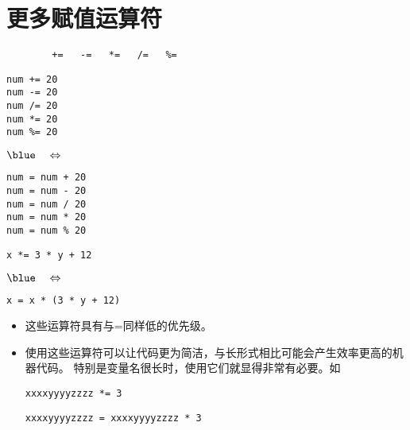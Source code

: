 \section{更多赋值运算符}
\begin{frame}[fragile]\ft{\secname}
\begin{lstlisting}
        +=   -=   *=   /=   %=
\end{lstlisting}
\end{frame}

\begin{frame}[fragile]\ft{\secname}
\begin{minipage}{.4\textwidth}
\begin{lstlisting}
num += 20
num -= 20
num /= 20
num *= 20
num %= 20
\end{lstlisting}
\end{minipage}$\blue~~~\Leftrightarrow~~~$
\begin{minipage}{.4\textwidth}
\begin{lstlisting}
num = num + 20
num = num - 20
num = num / 20
num = num * 20
num = num % 20
\end{lstlisting}
\end{minipage}
\pause 
\begin{minipage}{.4\textwidth}
\begin{lstlisting}
x *= 3 * y + 12
\end{lstlisting}
\end{minipage}$\blue~~~\Leftrightarrow~~~$
\begin{minipage}{.45\textwidth}
\begin{lstlisting}
x = x * (3 * y + 12)
\end{lstlisting}
\end{minipage}
\end{frame}

\begin{frame}[fragile]\ft{\secname}
\begin{itemize}
\item 
这些运算符具有与=同样低的优先级。\\[0.1in]
\item
使用这些运算符可以让代码更为简洁，与长形式相比可能会产生效率更高的机器代码。
特别是变量名很长时，使用它们就显得非常有必要。如

\begin{lstlisting}
xxxxyyyyzzzz *= 3
\end{lstlisting}
\begin{lstlisting}
xxxxyyyyzzzz = xxxxyyyyzzzz * 3
\end{lstlisting}
\end{itemize}
\end{frame}
